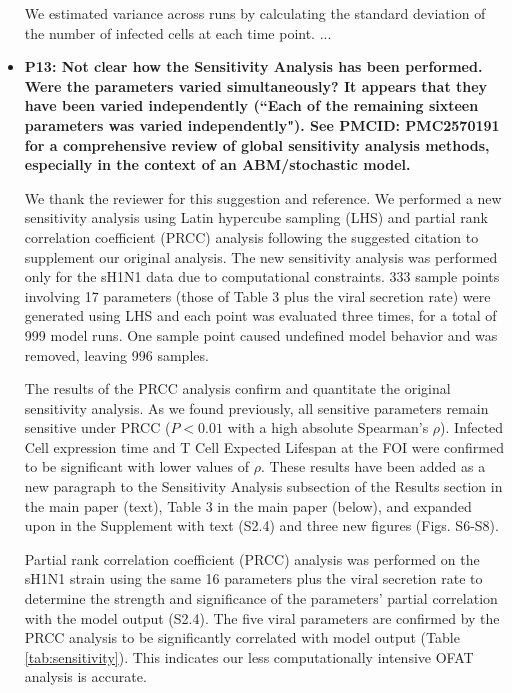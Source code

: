 \documentclass[10pt]{article}
\newcommand{\new}[1]{{\color{dkgreen}#1}}
\newenvironment{response}{\fontfamily{cms}\selectfont\small}{\par}
\begin{document}
\begin{itemize}
\begin{response}
\begin{displayquote}
We estimated variance across runs by calculating the standard deviation \new{of the number of infected cells} at each time point. ...
\end{displayquote}
\end{response}

\item \textbf{P13: Not clear how the Sensitivity Analysis has been performed. Were the parameters varied simultaneously? It appears that they have been varied independently (``Each of the remaining sixteen parameters was varied independently"). See PMCID: PMC2570191 for a comprehensive review of global sensitivity analysis methods, especially in the context of an ABM/stochastic model.}

\begin{response}

We thank the reviewer for this suggestion and reference. We performed a new sensitivity analysis using Latin hypercube sampling (LHS) and partial rank correlation coefficient (PRCC) analysis following the suggested citation to supplement our original analysis.  The new sensitivity analysis was performed only for the sH1N1 data due to computational constraints.  333 sample points involving 17 parameters (those of Table 3 plus the viral secretion rate) were generated using LHS and each point was evaluated three times, for a total of 999 model runs.  One sample point caused undefined model behavior and was removed, leaving 996 samples.

The results of the PRCC analysis confirm and quantitate the original sensitivity analysis.  As we found previously, all sensitive parameters remain sensitive under PRCC ($P < 0.01$ with a high absolute Spearman's $\rho$).  Infected Cell expression time and T Cell Expected Lifespan at the FOI were confirmed to be significant with lower values of $\rho$.  These results have been added as a new paragraph to the Sensitivity Analysis subsection of the Results section in the main paper (text), Table 3 in the main paper (below), and expanded upon in the Supplement with text (S2.4) and three new figures (Figs. S6-S8).

\begin{displayquote}
\new{Partial rank correlation coefficient (PRCC) analysis was performed on the sH1N1 strain using the same 16 parameters plus the viral secretion rate to determine the strength and significance of the parameters' partial correlation with the model output (S2.4).  The  five viral parameters are confirmed by the PRCC analysis to be significantly correlated with model output (Table \ref{tab:sensitivity}).  This indicates our less computationally intensive OFAT analysis is accurate.}
\end{displayquote}


\end{response}
\end{itemize}
\end{document}
